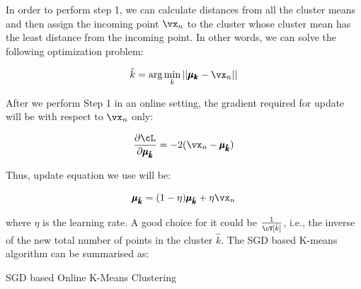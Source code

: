 \documentclass[a4paper,11pt]{article}
\begin{document}
\begin{mlsolution}

In order to perform step 1, we can calculate distances from all the cluster means and then assign the incoming point $\vx_n$ to the cluster whose cluster mean has the least distance from the incoming point. In other words, we can solve the following optimization problem:

\begin{equation*}
    \hat{k} = \text{arg} \min\limits_k ||\pmb{\mu_k} - \vx_n||
\end{equation*}

After we perform Step 1 in an online setting, the gradient required for update will be with respect to $\vx_n$ only:

\begin{equation*}
    \frac{\partial \cL}{\partial \pmb{\mu_{\hat{k}}}} = -2(\vx_n - \pmb{\mu_{\hat{k}}})
\end{equation*}

Thus, update equation we use will be:

\begin{equation*}
    \pmb{\mu_{\hat{k}}} = (1-\eta)\pmb{\mu_{\hat{k}}} + \eta\vx_n
\end{equation*}

where $\eta$ is the learning rate. A good choice for it could be $\frac{1}{\cV[\hat{k}]}$, i.e., the inverse of the new total number of points in the cluster $\hat{k}$. The SGD based K-means algorithm can be summarised as:\\

\begin{algorithm}[H]
    \DontPrintSemicolon
    \SetAlgoLined
    \caption{SGD based Online K-Means Clustering}
\end{algorithm}


\end{mlsolution}
\end{document}
